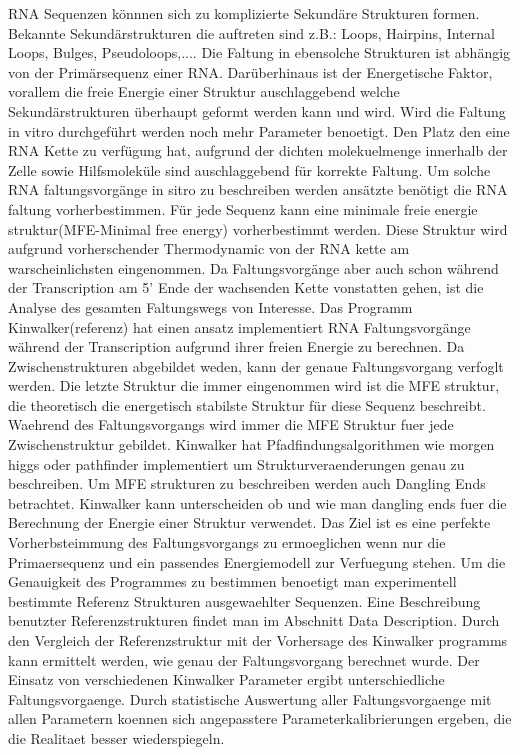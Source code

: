 RNA Sequenzen könnnen sich zu komplizierte Sekundäre Strukturen formen. Bekannte Sekundärstrukturen die auftreten sind z.B.: Loops, Hairpins, Internal Loops, Bulges, Pseudoloops,.... Die Faltung in ebensolche Strukturen ist abhängig von der Primärsequenz einer RNA. Darüberhinaus ist der Energetische Faktor, vorallem die freie Energie einer Struktur auschlaggebend welche Sekundärstrukturen überhaupt geformt werden kann und wird. Wird die Faltung in vitro durchgeführt werden noch mehr Parameter benoetigt. Den Platz den eine RNA Kette zu verfügung hat, aufgrund der dichten molekuelmenge innerhalb der Zelle sowie Hilfsmoleküle sind auschlaggebend für korrekte Faltung.
Um solche RNA faltungsvorgänge in sitro zu beschreiben werden ansätzte benötigt die RNA faltung vorherbestimmen. Für jede Sequenz kann eine minimale freie energie struktur(MFE-Minimal free energy) vorherbestimmt werden. Diese Struktur wird aufgrund vorherschender Thermodynamic von der RNA kette am warscheinlichsten eingenommen.
Da Faltungsvorgänge aber auch schon während der Transcription am 5' Ende der wachsenden Kette vonstatten gehen, ist die Analyse des gesamten Faltungswegs von Interesse. Das Programm Kinwalker(referenz) hat einen ansatz implementiert RNA Faltungsvorgänge während der Transcription aufgrund ihrer freien Energie zu berechnen. Da Zwischenstrukturen abgebildet weden, kann der genaue Faltungsvorgang verfoglt werden. Die letzte Struktur die immer eingenommen wird ist die MFE struktur, die theoretisch die energetisch stabilste Struktur für diese Sequenz beschreibt. Waehrend des Faltungsvorgangs wird immer die MFE Struktur fuer jede Zwischenstruktur gebildet. Kinwalker hat Pfadfindungsalgorithmen wie morgen higgs oder pathfinder implementiert um Strukturveraenderungen genau zu beschreiben. Um MFE strukturen zu beschreiben werden auch Dangling Ends betrachtet. Kinwalker kann unterscheiden ob und wie man dangling ends fuer die Berechnung der Energie einer Struktur verwendet. Das Ziel ist es eine perfekte Vorherbsteimmung des Faltungsvorgangs zu ermoeglichen wenn nur die Primaersequenz und ein passendes Energiemodell zur Verfuegung stehen. Um die Genauigkeit des Programmes zu bestimmen benoetigt man experimentell bestimmte Referenz Strukturen ausgewaehlter Sequenzen. Eine Beschreibung benutzter Referenzstrukturen findet man im Abschnitt Data Description. Durch den Vergleich der Referenzstruktur mit der Vorhersage des Kinwalker programms kann ermittelt werden, wie genau der Faltungsvorgang berechnet wurde. Der Einsatz von verschiedenen Kinwalker Parameter ergibt unterschiedliche Faltungsvorgaenge. Durch statistische Auswertung aller Faltungsvorgaenge mit allen Parametern koennen sich angepasstere Parameterkalibrierungen ergeben, die die Realitaet besser wiederspiegeln.

